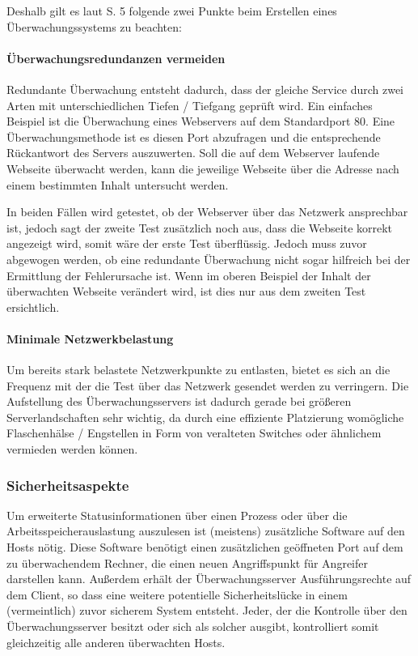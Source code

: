 Deshalb gilt es laut \cite{Jose07} S. 5 folgende zwei Punkte beim Erstellen eines Überwachungssystems zu beachten:

\paragraph{Überwachungsredundanzen vermeiden}
Redundante Überwachung entsteht dadurch, dass der gleiche Service durch zwei Arten mit unterschiedlichen Tiefen / Tiefgang geprüft wird.
Ein einfaches Beispiel ist die Überwachung eines Webservers auf dem Standardport 80.
Eine Überwachungsmethode ist es diesen Port abzufragen und die entsprechende Rückantwort des Servers auszuwerten.
Soll die auf dem Webserver laufende Webseite überwacht werden, kann die jeweilige Webseite über die Adresse nach einem bestimmten Inhalt untersucht werden.

In beiden Fällen wird getestet, ob der Webserver über das Netzwerk ansprechbar ist, jedoch sagt der zweite Test zusätzlich noch aus, dass die Webseite korrekt angezeigt wird, somit wäre der erste Test überflüssig.
Jedoch muss zuvor abgewogen werden, ob eine redundante Überwachung nicht sogar hilfreich bei der Ermittlung der Fehlerursache ist.
Wenn im oberen Beispiel der Inhalt der überwachten Webseite verändert wird, ist dies nur aus dem zweiten Test ersichtlich.

\paragraph{Minimale Netzwerkbelastung}
Um bereits stark belastete Netzwerkpunkte zu entlasten, bietet es sich an die Frequenz mit der die Test über das Netzwerk gesendet werden zu verringern.
Die Aufstellung des Überwachungsservers ist dadurch gerade bei größeren Serverlandschaften sehr wichtig, da durch eine effiziente Platzierung womögliche Flaschenhälse / Engstellen in Form von veralteten Switches oder ähnlichem vermieden werden können.

\subsubsection{Sicherheitsaspekte}
Um erweiterte Statusinformationen über einen Prozess oder über die Arbeitsspeicherauslastung auszulesen ist (meistens) zusätzliche Software auf den Hosts nötig.
Diese Software benötigt einen zusätzlichen geöffneten Port auf dem zu überwachendem Rechner, die einen neuen Angriffspunkt für Angreifer darstellen kann.
Außerdem erhält der Überwachungsserver Ausführungsrechte auf dem Client, so dass eine weitere potentielle Sicherheitslücke in einem (vermeintlich) zuvor sicherem System entsteht.
Jeder, der die Kontrolle über den Überwachungsserver besitzt oder sich als solcher ausgibt, kontrolliert somit gleichzeitig alle anderen überwachten Hosts.

